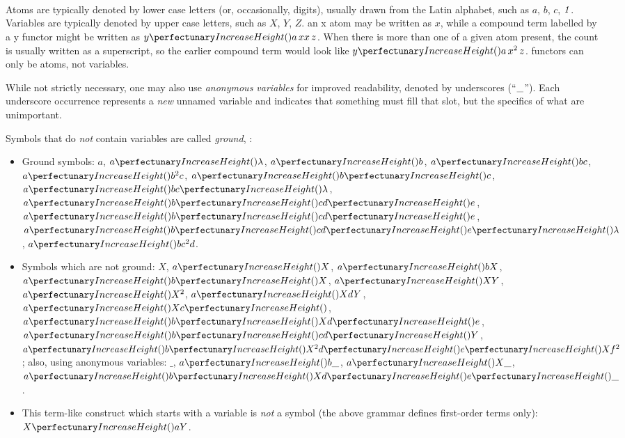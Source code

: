 \begin{framed}
\vspace{-0.6cm}
\begin{small}
\begin{bnf*}
    \\
    \\
    \\
\end{bnf*}
\end{small}
\vspace{-0.8cm}
\end{framed}

Atoms are typically denoted by lower case letters (or, occasionally, digits), usually drawn from the Latin alphabet, 
such as \(a\), \(b\), \(c\), \(\mathit{1}\). 
Variables are typically denoted by upper case letters, 
such as \(X\), \(Y\), \(Z\).
\Eg{} an x atom may be written as \(x\), while a compound term labelled by a y \gls{functor} might be written as \(\cpfunc{y}{a \, xx \, z}\).  When there is more than one of a given atom present, the count is usually written as a superscript, so the earlier compound term would look like \(\cpfunc{y}{a \, x^2 \, z}\).  
\Glspl{functor} can only be atoms, not variables.

While not strictly necessary, one may also use \emph{anonymous variables} for improved readability, denoted by underscores (``\(\_\)'').
Each underscore occurrence represents a \emph{new} unnamed variable
and indicates that something must fill that slot, but the specifics of what are unimportant.

Symbols that do \emph{not} contain variables are called \emph{ground}, \eg{}:
\begin{itemize}
\item Ground symbols:
\(a\), \(\cpfunc{a}{\cpempty}\), \(\cpfunc{a}{b}\), \(\cpfunc{a}{b c}\), \(\cpfunc{a}{b^2 c}\), \(\cpfunc{a}{\cpfunc{b}{c}}\), \(\cpfunc{a}{b\cpfunc{c}{\cpempty}}\), \(\cpfunc{a}{\cpfunc{b}{c}\cpfunc{d}{e}}\), \(\cpfunc{a}{\cpfunc{b}{c}\cpfunc{d}{e}}\), \(\cpfunc{a}{\cpfunc{b}{c}\cpfunc{d}{\cpfunc{e}{\cpempty}}}\), \(\cpfunc{a}{bc^2 d}\).

\smallskip
\item Symbols which are not ground:
\(X\), \(\cpfunc{a}{X}\), \(\cpfunc{a}{bX}\), \(\cpfunc{a}{\cpfunc{b}{X}}\), \(\cpfunc{a}{XY}\), \(\cpfunc{a}{X^2}\), \(\cpfunc{a}{XdY}\),  \(\cpfunc{a}{X\cpfunc{c}{}}\), \(\cpfunc{a}{\cpfunc{b}{X}\cpfunc{d}{e}}\), \(\cpfunc{a}{\cpfunc{b}{c}\cpfunc{d}{Y}}\), \(\cpfunc{a}{\cpfunc{b}{X^2}\cpfunc{d}{\cpfunc{e}{Xf^2}}}\);
also, using anonymous variables: \(\_\), \(\cpfunc{a}{b\_}\), \(\cpfunc{a}{X\_}\), \(\cpfunc{a}{\cpfunc{b}{X}\cpfunc{d}{\cpfunc{e}{\_}}}\).

\smallskip
\item This term-like construct which starts with a variable is \emph{not} a symbol (the above grammar defines first-order terms only):
\(\cpfunc{X}{a Y}\).
\end{itemize}

